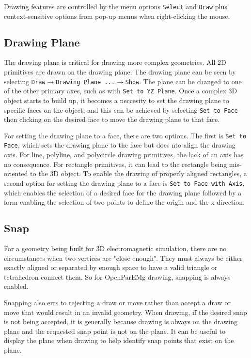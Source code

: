 \documentclass[titlepage]{article}
\renewcommand\_{\textunderscore\linebreak[1]}
\begin{document}
Drawing features are controlled by the menu options \texttt{Select} and \texttt{Draw} plus context-sensitive options from pop-up menus when right-clicking the mouse.

\subsection{Drawing Plane}\label{sec:drawing_plane}

The drawing plane is critical for drawing more complex geometries.  All 2D primitives are drawn on the drawing plane.  The drawing plane can be seen by selecting \texttt{Draw}$\rightarrow$\texttt{Drawing Plane ...}$\rightarrow$\texttt{Show}.  The plane can be changed to one of the other primary axes, such as with \texttt{Set to YZ Plane}.  Once a complex 3D object starts to build up, it becomes a neccesity to set the drawing plane to specific faces on the object, and this can be achieved by selecting \texttt{Set to Face} then clicking on the desired face to move the drawing plane to that face.

For setting the drawing plane to a face, there are two options.  The first is \texttt{Set to Face}, which sets the drawing plane to the face but does nto align the drawing axis.  For line, polyline, and polycircle drawing primitives, the lack of an axis has no consequence.  For rectangle primitives, it can lead to the rectangle being mis-oriented to the 3D object.  To enable the drawing of properly aligned rectangles, a second option for setting the drawing plane to a face is \texttt{Set to Face with Axis}, which enables the selection of a desired face for the drawing plane followed by a form enabling the selection of two points to define the origin and the x-direction.

\subsection{Snap}

For a geometry being built for 3D electromagnetic simulation, there are no circumstances when two vertices are "close enough".  They must always be either exactly aligned or separated by enough space to have a valid triangle or tetrahedron connect them.  So for OpenParEMg drawing, snapping is always enabled.

Snapping also errs to rejecting a draw or move rather than accept a draw or move that would result in an invalid geometry.  When drawing, if the desired snap is not being accepted, it is generally because drawing is always on the drawing plane and the requested snap point is not on the plane.  It can be useful to display the plane when drawing to help identify snap points that exist on the plane.
\end{document}
